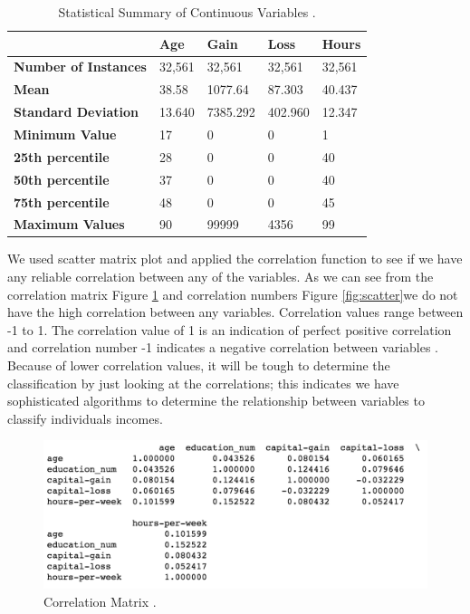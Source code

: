 \documentclass[sigconf]{acmart}
\begin{document}
\begin{table}[!ht]
\centering
\begin{tabular}{|l|l|l|l|l|}
\hline
                    & \textbf{Age} & \textbf{Gain} & \textbf{Loss} & \textbf{Hours} \\ \hline
\textbf{Number of Instances} & 32,561 & 32,561       & 32,561       & 32,561         \\ \hline
\textbf{Mean}                & 38.58  & 1077.64      & 87.303       & 40.437         \\ \hline
\textbf{Standard Deviation}  & 13.640 & 7385.292     & 402.960      & 12.347         \\ \hline
\textbf{Minimum Value}       & 17     & 0            & 0            & 1              \\ \hline
\textbf{25th percentile}     & 28     & 0            & 0            & 40             \\ \hline
\textbf{50th percentile}     & 37     & 0            & 0            & 40             \\ \hline
\textbf{75th percentile}     & 48     & 0            & 0            & 45             \\ \hline
\textbf{Maximum Values}      & 90     & 99999        & 4356         & 99             \\ \hline
\end{tabular}
\caption{Statistical Summary of Continuous Variables \cite{Borga2017}.}
\label{my-label}
\end{table}

\par We used scatter matrix plot and applied the correlation function to see if we have any reliable correlation between any of the variables. As we can see from the correlation matrix Figure \ref{fig:scatter-matrix} and correlation numbers Figure \ref{fig:scatter}we do not have the high correlation between any variables. Correlation values range between -1 to 1. The correlation value of 1 is an indication of perfect positive correlation and correlation number -1 indicates a negative correlation between variables \cite{www-investopedia}. Because of lower correlation values, it will be tough to determine the classification by just looking at the correlations; this indicates we have sophisticated algorithms to determine the relationship between variables to classify individuals incomes. 

 \begin{figure}[!ht]
  \centering
      \includegraphics[width=\columnwidth]{images/scatter.png}
  \caption{Correlation Matrix \cite{Borga2017}.}\label{fig:scatter-matrix}
\end{figure}
\end{document}
